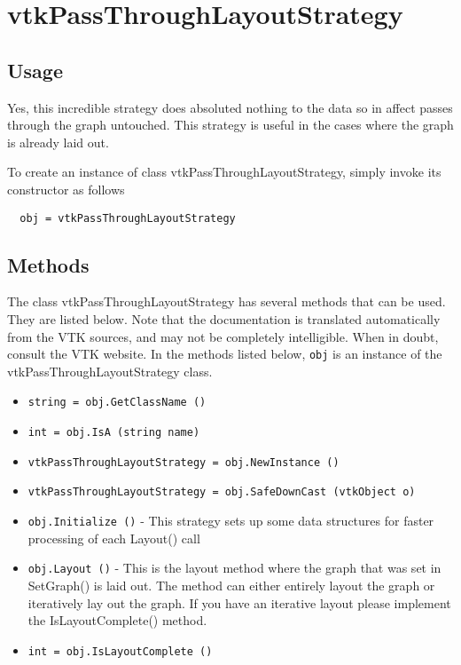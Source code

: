 \section{vtkPassThroughLayoutStrategy}

\subsection{Usage}

 Yes, this incredible strategy does absoluted nothing to the data
 so in affect passes through the graph untouched. This strategy
 is useful in the cases where the graph is already laid out.

To create an instance of class vtkPassThroughLayoutStrategy, simply
invoke its constructor as follows
\begin{verbatim}
  obj = vtkPassThroughLayoutStrategy
\end{verbatim}
\subsection{Methods}

The class vtkPassThroughLayoutStrategy has several methods that can be used.
  They are listed below.
Note that the documentation is translated automatically from the VTK sources,
and may not be completely intelligible.  When in doubt, consult the VTK website.
In the methods listed below, \verb|obj| is an instance of the vtkPassThroughLayoutStrategy class.
\begin{itemize}
\item  \verb|string = obj.GetClassName ()|

\item  \verb|int = obj.IsA (string name)|

\item  \verb|vtkPassThroughLayoutStrategy = obj.NewInstance ()|

\item  \verb|vtkPassThroughLayoutStrategy = obj.SafeDownCast (vtkObject o)|

\item  \verb|obj.Initialize ()| -  This strategy sets up some data structures
 for faster processing of each Layout() call

\item  \verb|obj.Layout ()| -  This is the layout method where the graph that was
 set in SetGraph() is laid out. The method can either
 entirely layout the graph or iteratively lay out the
 graph. If you have an iterative layout please implement
 the IsLayoutComplete() method.

\item  \verb|int = obj.IsLayoutComplete ()|

\end{itemize}
